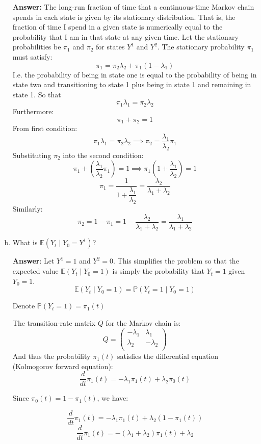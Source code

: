 \documentclass[11pt]{extarticle}
\theoremstyle{plain}
\theoremstyle{definition}
\begin{document}
\begin{enumerate}[(a)]
\textbf{Answer:} The long-run fraction of time that a continuous-time Markov chain spends in each state is given by its stationary distribution. That is, the fraction of time I spend in a given state is numerically equal to the probability that I am in that state at any given time.  Let the stationary probabilities be \( \pi_1 \) and \( \pi_2 \) for states \( Y^1 \) and \( Y^2 \). The stationary probability $\pi_1$ must satisfy:
 \[
   \pi_1 = \pi_2 \lambda_2 + \pi_1 (1-\lambda_1)
 \]
I.e. the probability of being in state one is equal to the probability of being in state two and transitioning to state 1 plus being in state 1 and remaining in state 1.
So that
  \[
   \pi_1 \lambda_1 = \pi_2 \lambda_2
   \]
Furthermore:
   \[
   \pi_1 + \pi_2 = 1
   \]
From first condition:
\[
\pi_1 \lambda_1 = \pi_2 \lambda_2 \implies \pi_2 = \frac{\lambda_1}{\lambda_2} \pi_1
\]
Substituting \( \pi_2 \) into the second condition:
\[
\pi_1 + \left( \frac{\lambda_1}{\lambda_2} \pi_1 \right) = 1 \implies \pi_1 \left( 1 + \frac{\lambda_1}{\lambda_2} \right) = 1
\]
\[
\pi_1 = \frac{1}{1 + \dfrac{\lambda_1}{\lambda_2}} = \frac{\lambda_2}{\lambda_1 + \lambda_2}
\]
Similarly:
\[
\pi_2 = 1 - \pi_1 = 1 - \frac{\lambda_2}{\lambda_1 + \lambda_2} = \frac{\lambda_1}{\lambda_1 + \lambda_2}
\]

\item What is $\mathbb E (Y_t \mid Y_0 = Y^1)$?

\textbf{Answer}: Let \( Y^1 = 1 \) and \( Y^2 = 0 \). This simplifies the problem so that the expected value \( \mathbb{E}(Y_t \mid Y_0 = 1) \) is simply the probability that \( Y_t = 1 \) given \( Y_0 = 1 \).
\[
\mathbb{E}(Y_t \mid Y_0 = 1) = \mathbb{P}(Y_t = 1 \mid Y_0 = 1)
\]

Denote $\mathbb{P}(Y_t = 1 )= \pi_1(t) $

The transition-rate matrix \( Q \) for the Markov chain is:
\[
Q = \begin{pmatrix}
    -\lambda_1 & \lambda_1 \\
    \lambda_2 & -\lambda_2 \\
\end{pmatrix}
\]
And thus the probability \( \pi_1(t) \) satisfies the differential equation (Kolmogorov forward equation):
\[
\frac{d}{dt} \pi_1(t) = -\lambda_1 \pi_1(t) + \lambda_2 \pi_0(t)
\]

Since \( \pi_0(t) = 1 - \pi_1(t) \), we have:

\[
\frac{d}{dt} \pi_1(t) = -\lambda_1 \pi_1(t) + \lambda_2 \left( 1 - \pi_1(t) \right)
\]
\[
\frac{d}{dt} \pi_1(t) = -(\lambda_1 + \lambda_2) \pi_1(t) + \lambda_2
\]


\end{enumerate}
\end{document}
